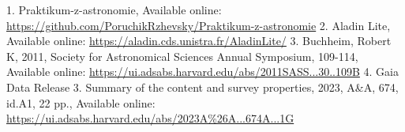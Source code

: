\documentclass[a4paper,11pt]{article}
\begin{document}
\begin{thebibliography}{9}
        1. Praktikum-z-astronomie, Available online: \url{https://github.com/PoruchikRzhevsky/Praktikum-z-astronomie}
        2. Aladin Lite, Available online: \url{https://aladin.cds.unistra.fr/AladinLite/}
        3. Buchheim, Robert K, 2011, Society for Astronomical Sciences Annual Symposium, 109-114, Available online: \url{https://ui.adsabs.harvard.edu/abs/2011SASS...30..109B}
        4. Gaia Data Release 3. Summary of the content and survey properties, 2023, A\&A, 674, id.A1, 22 pp., Available online: \url{https://ui.adsabs.harvard.edu/abs/2023A%26A...674A...1G}
\end{thebibliography}
\end{document}
